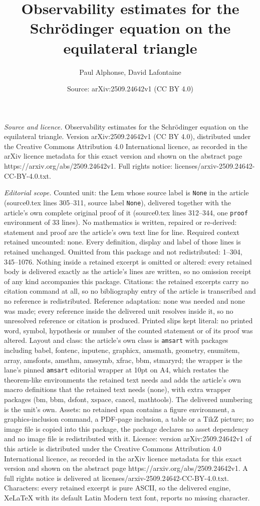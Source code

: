 \documentclass[10pt,a4paper]{amsart}
\title[Observability estimates for the Schr\"odinger equation on th]{Observability estimates for the Schr\"odinger equation on the equilateral triangle}
\author{Paul Alphonse, David Lafontaine}
\date{Source: arXiv:2509.24642v1 (CC BY 4.0)}
\begin{document}
\maketitle

\noindent\emph{Source and licence.} Observability estimates for the Schr\"odinger equation on the equilateral triangle. Version arXiv:2509.24642v1 (CC BY 4.0), distributed under the Creative Commons Attribution 4.0 International licence, as recorded in the arXiv licence metadata for this exact version and shown on the abstract page https://arxiv.org/abs/2509.24642v1. Full rights notice: licenses/arxiv-2509.24642-CC-BY-4.0.txt.\par\smallskip

\noindent\textit{Editorial scope.} Counted unit: the Lem whose source label is \texttt{None} in the article (source0.tex lines 305--311, source label \texttt{None}), delivered together with the article's own complete original proof of it (source0.tex lines 312--344, one \texttt{proof} environment of 33 lines). No mathematics is written, repaired or re-derived: statement and proof are the article's own text line for line. Required context retained uncounted: none. Every definition, display and label of those lines is retained unchanged. Omitted from this package and not redistributed: 1--304, 345--1076. Nothing inside a retained excerpt is omitted or altered: every retained body is delivered exactly as the article's lines are written, so no omission receipt of any kind accompanies this package. Citations: the retained excerpts carry no citation command at all, so no bibliography entry of the article is transcribed and no reference is redistributed. Reference adaptation: none was needed and none was made; every reference inside the delivered unit resolves inside it, so no unresolved reference or citation is produced. Printed slips kept literal: no printed word, symbol, hypothesis or number of the counted statement or of its proof was altered. Layout and class: the article's own class is \texttt{amsart} with packages including babel, fontenc, inputenc, graphicx, amsmath, geometry, enumitem, array, amsfonts, amsthm, amssymb, xfrac, bbm, stmaryrd; the wrapper is the lane's pinned \texttt{amsart} editorial wrapper at 10pt on A4, which restates the theorem-like environments the retained text needs and adds the article's own macro definitions that the retained text needs (none), with extra wrapper packages (bm, bbm, dsfont, xspace, cancel, mathtools). The delivered numbering is the unit's own. Assets: no retained span contains a figure environment, a graphics-inclusion command, a PDF-page inclusion, a table or a TikZ picture; no image file is copied into this package, the package declares no asset dependency and no image file is redistributed with it. Licence: version arXiv:2509.24642v1 of this article is distributed under the Creative Commons Attribution 4.0 International licence, as recorded in the arXiv licence metadata for this exact version and shown on the abstract page https://arxiv.org/abs/2509.24642v1. A full rights notice is delivered at licenses/arxiv-2509.24642-CC-BY-4.0.txt. Characters: every retained excerpt is pure ASCII, so the delivered engine, XeLaTeX with its default Latin Modern text font, reports no missing character.
\end{document}
